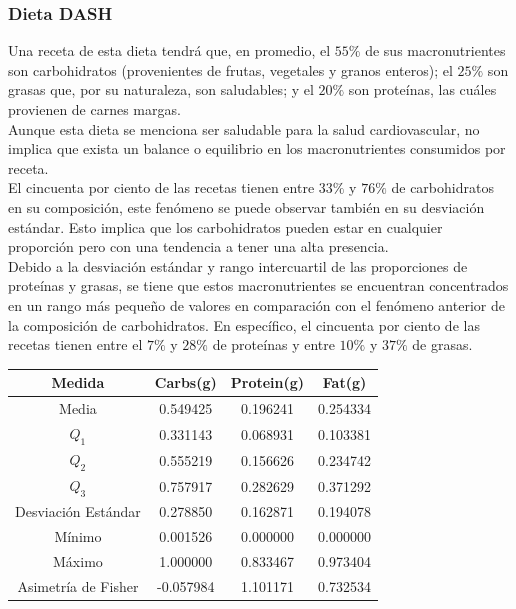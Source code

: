 \documentclass[12pt,a4paper]{article}
\begin{document}
        \subsubsection{Dieta DASH}

            Una receta de esta dieta tendrá que, en promedio, el $55\%$ de sus 
            macronutrientes son carbohidratos (provenientes de frutas, vegetales 
            y granos enteros); el $25\%$ son grasas que, por su naturaleza, son 
            saludables; y el $20\%$ son proteínas, las cuáles provienen de carnes margas.\\
            Aunque esta dieta se menciona ser saludable para la salud cardiovascular, 
            no implica que exista un balance o equilibrio en los macronutrientes 
            consumidos por receta.\\

            El cincuenta por ciento de las recetas tienen entre $33\%$ y $76\%$ 
            de carbohidratos en su composición, este fenómeno se puede observar 
            también	en su desviación estándar. Esto implica que los carbohidratos 
            pueden estar en cualquier proporción pero con una tendencia a tener 
            una alta presencia.\\

            Debido a la desviación estándar y rango intercuartil de las proporciones 
            de proteínas y grasas, se tiene que estos macronutrientes se encuentran 
            concentrados en un rango más pequeño de valores en comparación con el 
            fenómeno anterior de la composición de carbohidratos. En específico, el 
            cincuenta por ciento de las recetas tienen entre el $7\%$ y $28\%$ de 
            proteínas y entre $10\%$ y $37\%$ de grasas.

            \begin{center}
                \begin{tabular}{| c | c c c |}
                    \toprule
                    Medida & Carbs(g) & Protein(g) & Fat(g) \\
                    \midrule
                    Media               & 0.549425 & 0.196241 & 0.254334  \\
                    $Q_1$               & 0.331143 & 0.068931 & 0.103381  \\
                    $Q_2$               & 0.555219 & 0.156626 & 0.234742  \\
                    $Q_3$               & 0.757917 & 0.282629 &	0.371292  \\
                    Desviación Estándar & 0.278850 & 0.162871 & 0.194078  \\
                    Mínimo              & 0.001526 & 0.000000 & 0.000000  \\
                    Máximo              & 1.000000 & 0.833467 & 0.973404  \\
                    Asimetría de Fisher & -0.057984 & 1.101171 & 0.732534  \\
                    \bottomrule
                \end{tabular}
            \end{center}
\end{document}
